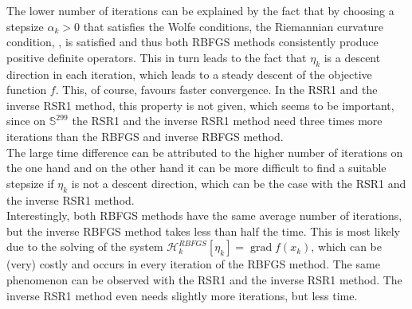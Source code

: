 The lower number of iterations can be explained by the fact that by choosing a stepsize $\alpha_k > 0$ that satisfies the Wolfe conditions, the Riemannian curvature condition, , is satisfied and thus both RBFGS methods consistently produce positive definite operators. This in turn leads to the fact that $\eta_k$ is a descent direction in each iteration, which leads to a steady descent of the objective function $f$. This, of course, favours faster convergence. In the RSR1 and the inverse RSR1 method, this property is not given, which seems to be important, since on $\mathbb{S}^{299}$ the RSR1 and the inverse RSR1 method need three times more iterations than the RBFGS and inverse RBFGS method. \\
The large time difference can be attributed to the higher number of iterations on the one hand and on the other hand it can be more difficult to find a suitable stepsize if $\eta_k$ is not a descent direction, which can be the case with the RSR1 and the inverse RSR1 method. \\
Interestingly, both RBFGS methods have the same average number of iterations, but the inverse RBFGS method takes less than half the time. This is most likely due to the solving of the system $\mathcal{H}^{RBFGS}_k [\eta_k] = \operatorname{grad} f(x_k)$, which can be (very) costly and occurs in every iteration of the RBFGS method. The same phenomenon can be observed with the RSR1 and the inverse RSR1 method. The inverse RSR1 method even needs slightly more iterations, but less time.
